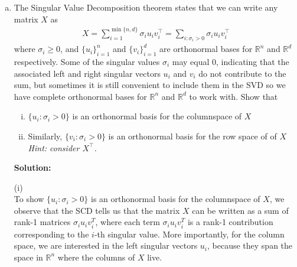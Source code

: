 \documentclass{article}
\newenvironment{solution}{\color{blue} \smallskip \textbf{Solution:}}{}
\begin{document}
\begin{enumerate}[(a)]
\begin{solution}
To prove the reverse direction (Necessity), we need to prove that if \( P = U U^T \) where \( U \in \mathbb{R}^{n \times d} \) and \( U^T U = I_d \), then \( P \) is a rank-\( d \) orthogonal projection matrix.

Firstly, for symmetricity. \( P = U U^T \) is symmetric because: \( P^T = (U U^T)^T = U U^T = P \). So, \( P = P^T \).

Secondly, for Idempotence, \( P^2 = P \): \( P^2 = (U U^T)(U U^T) = U (U^T U) U^T = U I_d U^T = U U^T = P \). Thus, \( P^2 = P \), so \( P \) is idempotent.

Thirdly, for rank. The rank of \( P = U U^T \) is \( d \) because \( U \in \mathbb{R}^{n \times d} \), and the columns of \( U \) are linearly independent (since \( U^T U = I_d \)).

Thus, \( P \) is a rank-\( d \) orthogonal projection matrix.
 
 
 
    \end{solution}

    \newpage
    \item
    The Singular Value Decomposition theorem states that we can write any matrix $X$ as 
    \begin{align*}
    X = \sum_{i=1}^{\min\{n,d\}} \sigma_{i} u_i v_i^{\top} = \sum_{i:\sigma_i > 0}\sigma_{i} u_i v_i^{\top}
    \end{align*}
    where $\sigma_{i} \ge 0$, and $\{u_i\}_{i=1}^n$ and $\{v_i\}_{i=1}^d$ are orthonormal bases for $\mathbb R^n$ and $\mathbb R^d$ respectively. Some of the singular values $\sigma_i$ may equal 0, indicating that the associated left and right singular vectors $u_i$ and $v_i$ do not contribute to the sum, but sometimes it is still convenient to include them in the SVD so we have complete orthonormal bases for $\mathbb R^n$ and $\mathbb R^d$ to work with.
    Show that 
    \begin{enumerate}[(i)]
    	\item $\{u_i : \sigma_i > 0\}$ is an orthonormal basis for the columnspace of $X$ 
    	\item Similarly, $\{v_i : \sigma_i > 0\}$ is an orthonormal basis for the row space of of $X$  \\ \emph{Hint: consider $X^\top$.}
    \end{enumerate}

    \begin{solution}

(i)\\
To show $\{u_i : \sigma_i > 0\}$ is an orthonormal basis for the columnspace of $X$, we observe that the SCD tells us that the matrix \( X \) can be written as a sum of rank-1 matrices \( \sigma_i u_i v_i^T \), where each term \( \sigma_i u_i v_i^T \) is a rank-1 contribution corresponding to the \( i \)-th singular value. More importantly, for the column space, we are interested in the left singular vectors \( u_i \), because they span the space in \( \mathbb{R}^n \) where the columns of \( X \) live. 


\end{solution}
\end{enumerate}
\end{document}
